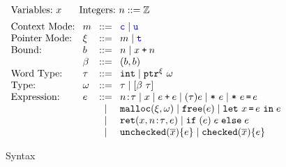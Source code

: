 \begin{figure}
  \small \centering
  \[ \hspace*{-1.5em}
\setlength{\arraycolsep}{4pt}
\begin{array}{l}
\begin{array}{ll}
       \text{Variables:}~ x
& \quad\text{Integers:}~n::=\mathbb{Z} 
\end{array}
\\[0.5em]
\begin{array}{llcllcl}
\text{Context Mode:} & m & ::= & \cmode \mid \umode \\
\text{Pointer Mode:} & \xi & ::= & m \mid \tmode \\
\text{Bound:} & b & ::= & n \mid x \plus n \\
              & \bvar & ::= & (b,b) \\
     \text{Word Type:}& \tau &::=& \tint\mid \tptr{\omega}{ \xi}
\\
\text{Type:}&\omega &::=& \tau \mid \tarrayb{\bvar}{\tau}
\\
\text{Expression:}& e & ::= & 
\evalue{n}{\tau} \mid x \mid \ebinop{e}{e}\mid \ecast{\tau}{e} \mid\estar{e}\mid\eassign{e}{e}
  \\
&&\mid& \emalloc{\xi}{\omega} \mid \efree{e} \mid \elet{x}{e}{e}   \\
&&\mid& \ret{x}{\evalue{n}{\tau}}{e} \mid \eif{e}{e}{e} \\
&&\mid&\eunchecked{\overline{x}}{e} \mid \echecked{\overline{x}}{e}
\end{array}
    \end{array}
  \]
  \caption{\systemname Syntax}
  \label{fig:checkc-syn}
\end{figure}


